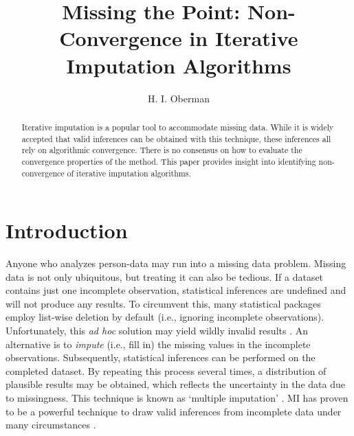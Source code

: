 \documentclass[Royal,times,sageh]{sagej}
\begin{document}
\title{Missing the Point: Non-Convergence in Iterative Imputation Algorithms}


\author{H. I. Oberman}




\begin{abstract}
Iterative imputation is a popular tool to accommodate missing data. While it is widely accepted that valid inferences can be obtained with this technique, these inferences all rely on algorithmic convergence. There is no consensus on how to evaluate the convergence properties of the method. This paper provides insight into identifying non-convergence of iterative imputation algorithms.
\end{abstract}


\maketitle

\hypertarget{introduction}{%
\section{Introduction}\label{introduction}}

Anyone who analyzes person-data may run into a missing data problem. Missing data is not only ubiquitous, but treating it can also be tedious. If a dataset contains just one incomplete observation, statistical inferences are undefined and will not produce any results. To circumvent this, many statistical packages employ list-wise deletion by default (i.e., ignoring incomplete observations). Unfortunately, this \emph{ad hoc} solution may yield wildly invalid results \citep{buur18}. An alternative is to \emph{impute} (i.e., fill in) the missing values in the incomplete observations. Subsequently, statistical inferences can be performed on the completed dataset. By repeating this process several times, a distribution of plausible results may be obtained, which reflects the uncertainty in the data due to missingness. This technique is known as `multiple imputation' \citep[MI;][]{rubin76}. MI has proven to be a powerful technique to draw valid inferences from incomplete data under many circumstances \citep{buur18}.
\end{document}
